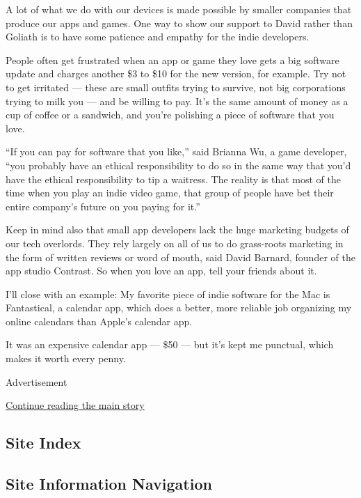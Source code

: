 A lot of what we do with our devices is made possible by smaller
companies that produce our apps and games. One way to show our support
to David rather than Goliath is to have some patience and empathy for
the indie developers.

People often get frustrated when an app or game they love gets a big
software update and charges another \$3 to \$10 for the new version, for
example. Try not to get irritated --- these are small outfits trying to
survive, not big corporations trying to milk you --- and be willing to
pay. It's the same amount of money as a cup of coffee or a sandwich, and
you're polishing a piece of software that you love.

``If you can pay for software that you like,'' said Brianna Wu, a game
developer, ``you probably have an ethical responsibility to do so in the
same way that you'd have the ethical responsibility to tip a waitress.
The reality is that most of the time when you play an indie video game,
that group of people have bet their entire company's future on you
paying for it.''

Keep in mind also that small app developers lack the huge marketing
budgets of our tech overlords. They rely largely on all of us to do
grass-roots marketing in the form of written reviews or word of mouth,
said David Barnard, founder of the app studio Contrast. So when you love
an app, tell your friends about it.

I'll close with an example: My favorite piece of indie software for the
Mac is Fantastical, a calendar app, which does a better, more reliable
job organizing my online calendars than Apple's calendar app.

It was an expensive calendar app --- \$50 --- but it's kept me punctual,
which makes it worth every penny.

Advertisement

\protect\hyperlink{after-bottom}{Continue reading the main story}

\hypertarget{site-index}{%
\subsection{Site Index}\label{site-index}}

\hypertarget{site-information-navigation}{%
\subsection{Site Information
Navigation}\label{site-information-navigation}}

